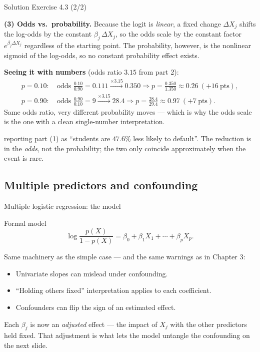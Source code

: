 \documentclass[aspectratio=169,11pt]{beamer}
\begin{document}
\begin{frame}{Solution \textemdash{} Exercise 4.3 (2/2)}
\begin{solutionbox}
\textbf{(3) Odds vs.\ probability.}
Because the logit is \emph{linear}, a fixed change $\Delta X_j$ shifts
the log-odds by the constant $\beta_j\,\Delta X_j$, so the odds scale by
the constant factor $e^{\beta_j \Delta X_j}$ regardless of the starting
point. The probability, however, is the nonlinear sigmoid of the
log-odds, so no constant probability effect exists.

\vspace{1mm}
\textbf{Seeing it with numbers} (odds ratio $3.15$ from part 2):
\[
\begin{aligned}
  p=0.10:&\ \text{odds } \tfrac{0.10}{0.90}=0.111
    \xrightarrow{\times 3.15} 0.350
    \Rightarrow p=\tfrac{0.350}{1.350}\approx 0.26\ (+16\ \text{pts}),\\
  p=0.90:&\ \text{odds } \tfrac{0.90}{0.10}=9
    \xrightarrow{\times 3.15} 28.4
    \Rightarrow p=\tfrac{28.4}{29.4}\approx 0.97\ (+7\ \text{pts}).
\end{aligned}
\]
Same odds ratio, very different probability moves --- which is why the
odds scale is the one with a clean single-number interpretation.
\end{solutionbox}
\begin{mistake}
reporting part (1) as ``students are $47.6\%$
less likely to default''. The reduction is in the \emph{odds}, not the
probability; the two only coincide approximately when the event is
rare.
\end{mistake}
\end{frame}

\subsection{Multiple predictors and confounding}

\begin{frame}{Multiple logistic regression: the model}
  \begin{block}{Formal model}
    \[
      \log\frac{p(X)}{1 - p(X)}
        = \beta_0 + \beta_1 X_1 + \cdots + \beta_p X_p.
    \]
  \end{block}
  Same machinery as the simple case --- and the same warnings as in
  Chapter 3:
  \begin{itemize}
    \item Univariate slopes can mislead under confounding.
    \item ``Holding others fixed'' interpretation applies to each
          coefficient.
    \item Confounders can flip the sign of an estimated effect.
  \end{itemize}
  \begin{takeaway}
    Each $\beta_j$ is now an \emph{adjusted} effect --- the impact of
    $X_j$ with the other predictors held fixed. That adjustment is what
    lets the model untangle the confounding on the next slide.
  \end{takeaway}
\end{frame}
\end{document}
